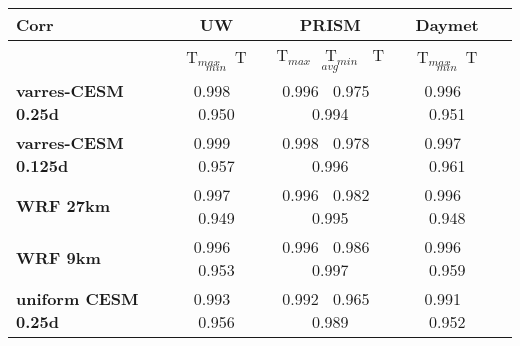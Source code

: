 \begin{table}
\begin{center}
\begin{tabular}{lcccc}
\hline \textbf{Corr} & \textbf{UW}  & \textbf{PRISM} & \textbf{Daymet} \\
\hline $    $ & T$_{max}$ $\     $  T$_{min}$ & T$_{max}$ $\     $  T$_{min}$ $\     $ T$_{avg}$& T$_{max}$ $\     $  T$_{min}$\\
\hline \textbf{varres-CESM 0.25d} & 0.998 $\ $ 0.950 & 0.996 $\ $ 0.975 $\ $ 0.994 & 0.996 $\ $ 0.951 \\
\textbf{varres-CESM 0.125d} & 0.999 $\ $ 0.957 & 0.998 $\ $ 0.978 $\ $ 0.996 & 0.997 $\ $ 0.961 \\
\textbf{WRF 27km} & 0.997 $\ $ 0.949 & 0.996 $\ $ 0.982 $\ $ 0.995 & 0.996 $\ $ 0.948 \\
\textbf{WRF 9km} & 0.996 $\ $ 0.953 & 0.996 $\ $ 0.986 $\ $ 0.997 & 0.996 $\ $ 0.959 \\
\textbf{uniform CESM 0.25d} & 0.993 $\ $ 0.956 & 0.992 $\ $ 0.965 $\ $ 0.989 & 0.991 $\ $ 0.952 \\
\hline
\end{tabular}
\end{center}
\end{table}

